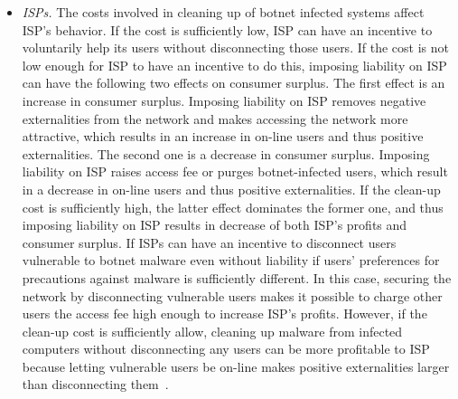 \begin{itemize}
\item \textit{ISPs.} The costs involved in cleaning up of botnet infected systems affect ISP’s behavior. If the cost is sufficiently low, ISP can have an incentive to voluntarily help its users without disconnecting those users. If the cost is not low enough for ISP to have an incentive to do this, imposing liability on ISP can have the following two effects on consumer surplus. The first effect is an increase in consumer surplus. Imposing liability on ISP removes negative externalities from the network and makes accessing the network more attractive, which results in an increase in on-line users and thus positive externalities. The second one is a decrease in consumer surplus. Imposing liability on ISP raises access fee or purges botnet-infected users, which result in a decrease in on-line users and thus positive externalities. If the clean-up cost is sufficiently high, the latter effect dominates the former one, and thus imposing liability on ISP results in decrease of both ISP’s profits and consumer surplus. If ISPs can have an incentive to disconnect users vulnerable to botnet malware even without liability if users’ preferences for precautions against malware is sufficiently different. In this case, securing the network by disconnecting vulnerable users makes it possible to charge other users the access fee high enough to increase ISP’s profits. However, if the clean-up cost is sufficiently allow, cleaning up malware from infected computers without disconnecting any users can be more profitable to ISP because letting vulnerable users be on-line makes positive externalities larger than disconnecting them~\cite{kinukawa2012should}.




\end{itemize}
